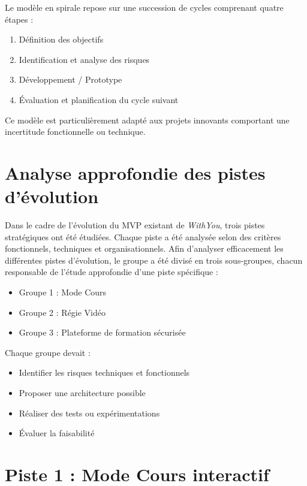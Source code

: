 \documentclass[12pt,a4paper]{report}
\begin{document}
Le modèle en spirale repose sur une succession de cycles comprenant quatre étapes :
\begin{enumerate}
    \item Définition des objectifs
    \item Identification et analyse des risques
    \item Développement / Prototype
    \item Évaluation et planification du cycle suivant
\end{enumerate}

Ce modèle est particulièrement adapté aux projets innovants comportant une incertitude fonctionnelle ou technique.




\section{Analyse approfondie des pistes d’évolution}

Dans le cadre de l’évolution du MVP existant de \textit{WithYou}, trois pistes stratégiques ont été étudiées. 
Chaque piste a été analysée selon des critères fonctionnels, techniques et organisationnels.
Afin d’analyser efficacement les différentes pistes d’évolution, le groupe a été divisé en trois sous-groupes, chacun responsable de l’étude approfondie d’une piste spécifique :

\begin{itemize}
    \item Groupe 1 : Mode Cours
    \item Groupe 2 : Régie Vidéo
    \item Groupe 3 : Plateforme de formation sécurisée
\end{itemize}

Chaque groupe devait :
\begin{itemize}
    \item Identifier les risques techniques et fonctionnels
    \item Proposer une architecture possible
    \item Réaliser des tests ou expérimentations
    \item Évaluer la faisabilité
\end{itemize}

\newpage
\section{Piste 1 : Mode Cours interactif}
\label{sec:piste1}
\end{document}
